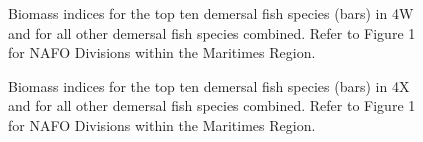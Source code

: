 \documentclass[11pt]{book}
\begin{document}
\begin{figure}[htb]

{\centering {} 

}

\caption{Biomass indices for the top ten demersal fish species (bars) in 4W and for all other demersal fish species combined. Refer to Figure 1 for NAFO Divisions within the Maritimes Region.}\label{fig:4-fig-biomass4X}
\end{figure}

\begin{figure}[htb]

{\centering {} 

}

\caption{Biomass indices for the top ten demersal fish species (bars) in 4X and for all other demersal fish species combined. Refer to Figure 1 for NAFO Divisions within the Maritimes Region.}\label{fig:5-fig-biomass4W}
\end{figure}
\end{document}

